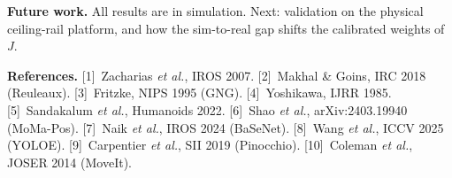 \documentclass[20pt,a4paper]{extarticle}
\newcommand{\lead}[1]{\textbf{#1}}
\begin{document}
\begin{minipage}[t]{0.487\linewidth}
\lead{Future work.} All results are in simulation. Next: validation on the
physical ceiling-rail platform, and how the sim-to-real gap shifts the
calibrated weights of $J$.

\end{minipage}

\vspace{3mm}
{\fontsize{13}{15.5}\selectfont\color{pgrey}
\textbf{References.}
[1]~Zacharias \textit{et al.}, IROS 2007.
[2]~Makhal \& Goins, IRC 2018 (Reuleaux).
[3]~Fritzke, NIPS 1995 (GNG).
[4]~Yoshikawa, IJRR 1985.
[5]~Sandakalum \textit{et al.}, Humanoids 2022.
[6]~Shao \textit{et al.}, arXiv:2403.19940 (MoMa-Pos).
[7]~Naik \textit{et al.}, IROS 2024 (BaSeNet).
[8]~Wang \textit{et al.}, ICCV 2025 (YOLOE).
[9]~Carpentier \textit{et al.}, SII 2019 (Pinocchio).
[10]~Coleman \textit{et al.}, JOSER 2014 (MoveIt).
\par}
\end{document}
